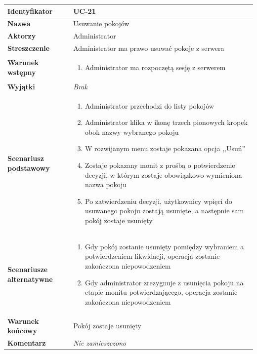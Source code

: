 \documentclass[11pt,oneside,a4paper,titlepage,onecolumn]{article}
\newenvironment{enumreq}
{ \begin{enumerate}[topsep=0pt,itemsep=-1ex,partopsep=1ex,parsep=1ex] }
{ \end{enumerate}                  }
\begin{document}
{\vspace{2em}

\begin{tabular}{ | l | l | }
	\hline
		\textbf{Identyfikator} & 
		UC-21
		\\
		
	\hline
		\textbf{Nazwa} & 
		Usuwanie pokojów
		\\
		
	\hline
		\textbf{Aktorzy} & \parbox[t]{11cm}{
			Administrator
		}\\
		 
	\hline
		\parbox[t]{4cm}{\textbf{Streszczenie}} & \parbox[t]{11cm}{
			Administrator ma prawo usuwać pokoje z serwera
			
		}\\
		
	\hline
		\parbox[t]{4cm}{\textbf{Warunek wstępny}} & \parbox[t]{11cm}{
			\begin{enumreq}
				\item Administrator ma rozpoczętą sesję z serwerem
			\end{enumreq}
				
		}
		\\
		
	\hline
		\parbox[t]{4cm}{\textbf{Wyjątki}} & \parbox[t]{11cm}{
			\textit{Brak}
			
		}
		\\

	\hline
		\parbox[t]{4cm}{\textbf{Scenariusz podstawowy}} & \parbox[t]{11cm}{
			\begin{enumreq}
				\item Administrator przechodzi do listy pokojów
				\item Administrator klika w ikonę trzech pionowych
				kropek obok nazwy wybranego pokoju
				\item W rozwijanym menu zostaje pokazana opcja ,,Usuń''
				\item Zostaje pokazany monit z prośbą o potwierdzenie
				decyzji, w którym zostaje obowiązkowo wymieniona nazwa
				pokoju
				\item Po zatwierdzeniu decyzji, użytkownicy wpięci do
				usuwanego pokoju zostają usunięte, a następnie sam
				pokój zostaje usunięty
			\end{enumreq}
		}
		\\
		
	\hline
		\parbox[t]{4cm}{\textbf{Scenariusze alternatywne}} & \parbox[t]
		{11cm}{
			\begin{enumreq}
				\item Gdy pokój zostanie usunięty pomiędzy wybraniem
				a potwierdzeniem likwidacji, operacja zostanie zakończona
				niepowodzeniem
				\item Gdy administrator zrezygnuje z usunięcia pokoju
				na etapie monitu potwierdzającego, operacja zostanie
				zakończona niepowodzeniem
			\end{enumreq}
		}
		\\
		
	\hline
		\parbox[t]{4cm}{\textbf{Warunek końcowy}} & \parbox[t]{11cm}{
			Pokój zostaje usunięty
		}
		\\
		
	\hline
		\parbox[t]{4cm}{\textbf{Komentarz}} & \parbox[t]{11cm}{
			\textit{Nie zamieszczono}
		}
		\\

	\hline
\end{tabular}
}
\end{document}
